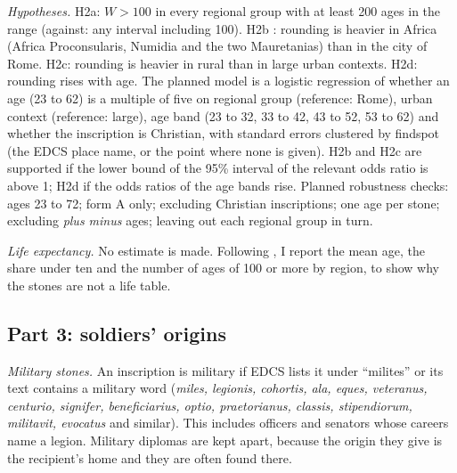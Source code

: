 \textit{Hypotheses.} H2a: $W > 100$ in every regional group with at least 200 ages in the range (against: any interval including 100). H2b \citep{duncanjones1977}: rounding is heavier in Africa (Africa Proconsularis, Numidia and the two Mauretanias) than in the city of Rome. H2c: rounding is heavier in rural than in large urban contexts. H2d: rounding rises with age. The planned model is a logistic regression of whether an age (23 to 62) is a multiple of five on regional group (reference: Rome), urban context (reference: large), age band (23 to 32, 33 to 42, 43 to 52, 53 to 62) and whether the inscription is Christian, with standard errors clustered by findspot (the EDCS place name, or the point where none is given). H2b and H2c are supported if the lower bound of the 95\% interval of the relevant odds ratio is above 1; H2d if the odds ratios of the age bands rise. Planned robustness checks: ages 23 to 72; form A only; excluding Christian inscriptions; one age per stone; excluding \textit{plus minus} ages; leaving out each regional group in turn.

\textit{Life expectancy.} No estimate is made. Following \citet{hopkins1966}, I report the mean age, the share under ten and the number of ages of 100 or more by region, to show why the stones are not a life table.

\subsection{Part 3: soldiers' origins}
\textit{Military stones.} An inscription is military if EDCS lists it under ``milites'' or its text contains a military word (\textit{miles, legionis, cohortis, ala, eques, veteranus, centurio, signifer, beneficiarius, optio, praetorianus, classis, stipendiorum, militavit, evocatus} and similar). This includes officers and senators whose careers name a legion. Military diplomas are kept apart, because the origin they give is the recipient's home and they are often found there.

